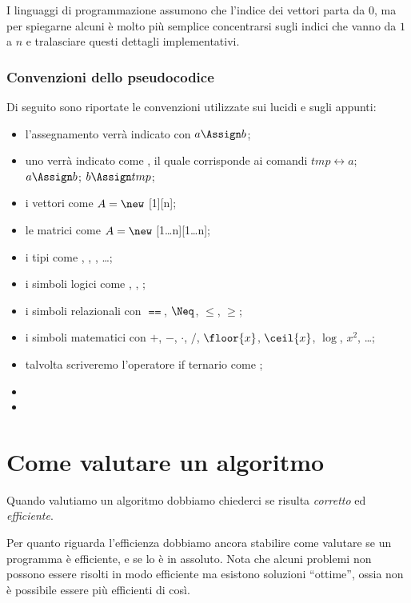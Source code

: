 I linguaggi di programmazione assumono che l'indice dei vettori parta da \(0\), ma per spiegarne alcuni è molto più semplice concentrarsi sugli indici che vanno da \(1\) a \(n\) e tralasciare questi dettagli implementativi.

\subsubsection{Convenzioni dello pseudocodice}

Di seguito sono riportate le convenzioni utilizzate sui lucidi e sugli appunti:
\begin{itemize}
    \item l'assegnamento verrà indicato con \(a \Assign b\);
    \item uno  verrà indicato come , il quale corrisponde ai comandi \(tmp \leftrightarrow a\); \(a \Assign b\); \(b \Assign tmp\);
    \item i vettori come  \(A = \new\) [1][n];
    \item le matrici come  \(A = \new\) [1\dots n][1\dots n];
    \item i tipi come \Int, \Real, \Bool, \dots;
    \item i simboli logici come \And, \Or, \Not;
    \item i simboli relazionali con \(\Equal\), \(\Neq\), \(\leqslant\), \(\geqslant\);
    \item i simboli matematici con \(+\), \(-\), \(\cdot\), \(/\), \(\floor{x}\), \(\ceil{x}\), \(\log\), \(x^2\), \dots;
    \item talvolta scriveremo l'operatore if ternario come ;
    \item {}
    \item {}
\end{itemize}

\section{Come valutare un algoritmo}

Quando valutiamo un algoritmo dobbiamo chiederci se risulta \emph{corretto} ed \emph{efficiente}.

Per quanto riguarda l'efficienza dobbiamo ancora stabilire come valutare se un programma è efficiente, e se lo è in assoluto.
Nota che alcuni problemi non possono essere risolti in modo efficiente ma esistono soluzioni \enquote{ottime}, ossia non è possibile essere più efficienti di così.

